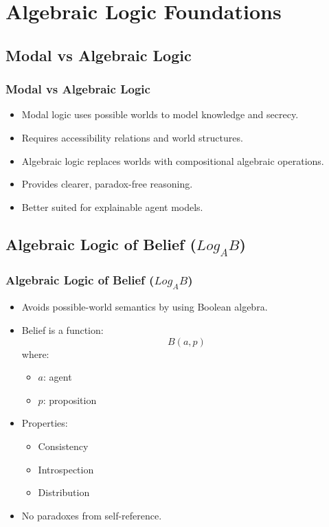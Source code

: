\documentclass[aspectratio=169]{beamer}
\begin{document}

\section{Algebraic Logic Foundations}

\subsection{Modal vs Algebraic Logic}
\begin{frame}
\frametitle{Modal vs Algebraic Logic}
\begin{itemize}
    \item Modal logic uses possible worlds to model knowledge and secrecy.
    \item Requires accessibility relations and world structures.
    \item Algebraic logic replaces worlds with compositional algebraic operations.
    \item Provides clearer, paradox-free reasoning.
    \item Better suited for explainable agent models.
\end{itemize}
\end{frame}

\subsection{Algebraic Logic of Belief ($Log_AB$)}
\begin{frame}
\frametitle{Algebraic Logic of Belief ($Log_AB$)}
\begin{itemize}
    \item Avoids possible-world semantics by using Boolean algebra.
    \item Belief is a function:
    \[
    B(a, p)
    \]
    where:
    \begin{itemize}
        \item $a$: agent
        \item $p$: proposition
    \end{itemize}
    \item Properties:
    \begin{itemize}
        \item Consistency
        \item Introspection
        \item Distribution
    \end{itemize}
    \item No paradoxes from self-reference.
\end{itemize}
\end{frame}
\end{document}
